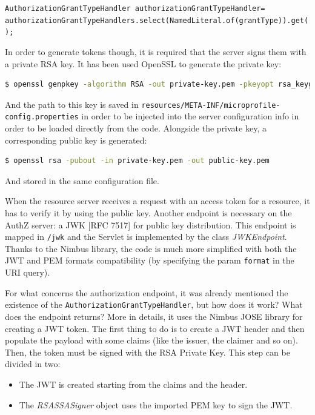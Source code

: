\noindent \texttt{\footnotesize{AuthorizationGrantTypeHandler authorizationGrantTypeHandler= \\
\indent authorizationGrantTypeHandlers.select(NamedLiteral.of(grantType)).get();}} 

\noindent In order to generate tokens though, it is required that the server signs them with a private RSA key. It has been used OpenSSL to generate the private key:

\begin{lstlisting}[language=bash, basicstyle=\fontsize{9}{11}\ttfamily]  
  $ openssl genpkey -algorithm RSA -out private-key.pem -pkeyopt rsa_keygen_bits:2048
\end{lstlisting}

\noindent And the path to this key is saved in \texttt{resources/META-INF/microprofile-config.properties} in order to be injected into the server configuration info in order to be loaded directly from the code. Alongside the private key, a corresponding public key is generated:

\begin{lstlisting}[language=bash, basicstyle=\fontsize{9}{11}\ttfamily]  
  $ openssl rsa -pubout -in private-key.pem -out public-key.pem
\end{lstlisting}

\noindent And stored in the same configuration file.

When the resource server receives a request with an access token for a resource, it has to verify it by using the public key. Another endpoint is necessary on the AuthZ server: a JWK [RFC 7517] for public key distribution. This endpoint is mapped in \texttt{/jwk} and the Servlet is implemented by the class \textit{JWKEndpoint}. Thanks to the Nimbus library, the code is much more simplified with both the JWT and PEM formats compatibility (by specifying the param \texttt{format} in the URI query).

For what concerns the authorization endpoint, it was already mentioned the existence of the \texttt{AuthorizationGrantTypeHandler}, but how does it work? What does the endpoint returns? More in details, it uses the Nimbus JOSE library for creating a JWT token. The first thing to do is to create a JWT header and then populate the payload with some claims (like the issuer, the claimer and so on). Then, the token must be signed with the RSA Private Key. This step can be divided in two: 

\begin{itemize}
    \item The JWT is created starting from the claims and the header.
    \item The \textit{RSASSASigner} object uses the imported PEM key to sign the JWT.
\end{itemize}

